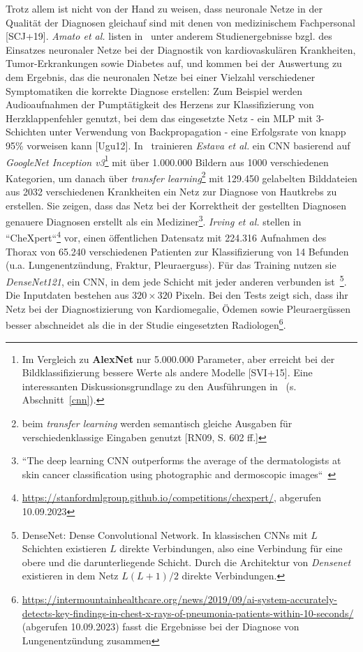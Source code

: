 Trotz allem ist nicht von der Hand zu weisen, dass neuronale Netze in der Qualität der Diagnosen gleichauf sind mit denen von medizinischem Fachpersonal [SCJ+19]. \textit{Amato et al.} listen in~\cite{ALP+13} unter anderem Studienergebnisse bzgl. des Einsatzes neuronaler Netze bei der Diagnostik von kardiovaskulären Krankheiten, Tumor-Erkrankungen sowie Diabetes auf, und kommen bei der Auswertung zu dem Ergebnis, das die neuronalen Netze bei einer Vielzahl verschiedener Symptomatiken die korrekte Diagnose erstellen: Zum Beispiel werden Audioaufnahmen der Pumptätigkeit des Herzens zur Klassifizierung von Herzklappenfehler genutzt, bei dem das eingesetzte Netz - ein MLP mit 3-Schichten unter Verwendung von Backpropagation - eine Erfolgsrate von knapp 95\% vorweisen kann [Ugu12]. In~\cite{EKN+17} trainieren \textit{Estava et al.} ein CNN basierend auf \textit{GoogleNet Inception v3}\footnote{
    Im Vergleich zu \textbf{AlexNet} nur 5.000.000 Parameter, aber erreicht bei der Bildklassifizierung bessere Werte als andere Modelle [SVI+15]. Eine interessanten Diskussionsgrundlage zu den Ausführungen in~\cite{Cun89} (s. Abschnitt~\ref{cnn}).
} mit über 1.000.000 Bildern aus 1000 verschiedenen Kategorien, um danach über \textit{transfer learning}\footnote{
    beim \textit{transfer learning} werden semantisch gleiche Ausgaben für verschiedenklassige Eingaben genutzt [RN09, S. 602 ff.]
} mit 129.450 gelabelten Bilddateien aus 2032 verschiedenen Krankheiten ein Netz zur Diagnose von Hautkrebs zu erstellen. Sie zeigen, dass das Netz bei der Korrektheit der gestellten Diagnosen genauere Diagnosen erstellt als ein Mediziner\footnote{
    ``The deep learning CNN outperforms the average of the dermatologists at skin cancer classification using photographic and dermoscopic images``~\cite[3, Figure 2]{EKN+17}
}.
\textit{Irving et al.} stellen in~\cite{IRK+19} ``CheXpert``\footnote{
    \url{https://stanfordmlgroup.github.io/competitions/chexpert/}, abgerufen 10.09.2023
} vor, einen öffentlichen Datensatz mit 224.316 Aufnahmen des Thorax von 65.240 verschiedenen Patienten zur Klassifizierung von 14 Befunden (u.a. Lungenentzündung, Fraktur, Pleuraerguss). Für das Training nutzen sie \textit{DenseNet121}, ein CNN, in dem jede Schicht mit jeder anderen verbunden ist~\cite{HLW16}\footnote{
    DenseNet: Dense Convolutional Network. In klassischen CNNs mit $L$ Schichten existieren $L$ direkte Verbindungen, also eine Verbindung für eine obere und die darunterliegende Schicht. Durch die Architektur von \textit{Densenet} existieren in dem Netz $L(L +1)/2$ direkte Verbindungen.
}. Die Inputdaten bestehen aus $320 \times 320$ Pixeln. Bei den Tests zeigt sich, dass ihr Netz bei der Diagnostizierung von Kardiomegalie, Ödemen sowie Pleuraergüssen besser abschneidet als die in der Studie eingesetzten Radiologen\footnote{
    \url{https://intermountainhealthcare.org/news/2019/09/ai-system-accurately-detects-key-findings-in-chest-x-rays-of-pneumonia-patients-within-10-seconds/} (abgerufen 10.09.2023) fasst die Ergebnisse bei der Diagnose von Lungenentzündung zusammen
}.

